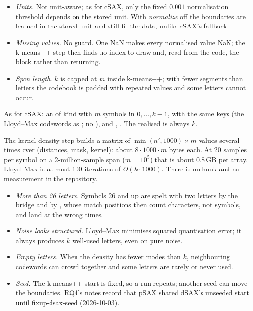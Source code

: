 \begin{itemize}
\item \emph{Units.} Not unit-aware; as for cSAX, only the fixed $0.001$ normalisation
  threshold depends on the stored unit. With \emph{normalize} off the boundaries are
  learned in the stored unit and still fit the data, unlike cSAX's fallback.
\item \emph{Missing values.} No guard. One NaN makes every normalised value NaN; the
  k-means++ step then finds no index to draw and, read from the code, the block
   rather than returning.
\item \emph{Span length.} $k$ is capped at $m$ inside k-means++; with fewer segments than
  letters the codebook is padded with repeated values and some letters cannot occur.
\end{itemize}

As for cSAX: an  of kind  with $m$ symbols in $0,\dots,k-1$,
 with the same keys (the Lloyd--Max codewords as
; no ), and ,
. The realised  is always $k$.

The kernel density step builds a matrix of $\min(n',1000)\times m$ values several times
over (distances, mask, kernel): about $8\cdot 1000\cdot m$ bytes each. At 20 samples per
symbol on a 2-million-sample span ($m = 10^5$) that is about 0.8\,GB per array. Lloyd--Max
is at most 100 iterations of $O(k\cdot 1000)$. There is no  hook and no
measurement in the repository.

\begin{itemize}
\item \emph{More than 26 letters.} Symbols 26 and up are spelt with two letters by the
  bridge and by , whose match positions then count
  characters, not symbols, and land at the wrong times.
\item \emph{Noise looks structured.} Lloyd--Max minimises squared quantisation error; it
  always produces $k$ well-used letters, even on pure noise.
\item \emph{Empty letters.} When the density has fewer modes than $k$, neighbouring
  codewords can crowd together and some letters are rarely or never used.
\item \emph{Seed.} The k-means++ start is fixed, so a run repeats; another seed can move
  the boundaries. RQ4's notes record that pSAX shared dSAX's unseeded start until
  fixup-dsax-seed (2026-10-03).
\end{itemize}

